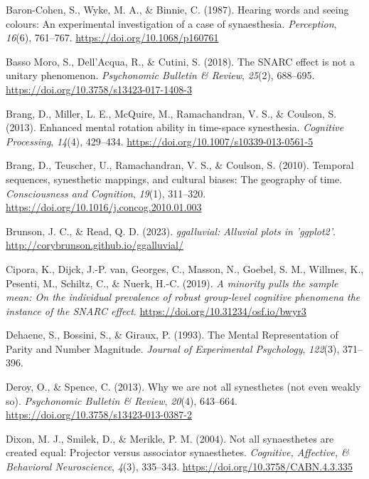 \documentclass[
  man,
  floatsintext,
  longtable,
  a4paper,
  nolmodern,
  notxfonts,
  notimes,
  colorlinks=true,linkcolor=blue,citecolor=blue,urlcolor=blue]{apa7}
\newlength{\cslhangindent}
\newenvironment{CSLReferences}[2] %
 {\begin{list}{}{%
  \setlength{\itemindent}{0pt}
  \setlength{\leftmargin}{0pt}
  \setlength{\parsep}{0pt}
  \ifodd #1
   \setlength{\leftmargin}{\cslhangindent}
   \setlength{\itemindent}{-1\cslhangindent}
  \fi
  \setlength{\itemsep}{#2\baselineskip}}}
 {\end{list}}
\begin{document}
\protect{}\label{refs}
\begin{CSLReferences}{1}{0}
Baron-Cohen, S., Wyke, M. A., \& Binnie, C. (1987). Hearing words and
seeing colours: An experimental investigation of a case of synaesthesia.
\emph{Perception}, \emph{16}(6), 761--767.
\url{https://doi.org/10.1068/p160761}

Basso Moro, S., Dell'Acqua, R., \& Cutini, S. (2018). The SNARC effect
is not a unitary phenomenon. \emph{Psychonomic Bulletin \& Review},
\emph{25}(2), 688--695. \url{https://doi.org/10.3758/s13423-017-1408-3}

Brang, D., Miller, L. E., McQuire, M., Ramachandran, V. S., \& Coulson,
S. (2013). Enhanced mental rotation ability in time-space synesthesia.
\emph{Cognitive Processing}, \emph{14}(4), 429--434.
\url{https://doi.org/10.1007/s10339-013-0561-5}

Brang, D., Teuscher, U., Ramachandran, V. S., \& Coulson, S. (2010).
Temporal sequences, synesthetic mappings, and cultural biases: The
geography of time. \emph{Consciousness and Cognition}, \emph{19}(1),
311--320. \url{https://doi.org/10.1016/j.concog.2010.01.003}

Brunson, J. C., \& Read, Q. D. (2023). \emph{{ggalluvial}: Alluvial
plots in 'ggplot2'}. \url{http://corybrunson.github.io/ggalluvial/}

Cipora, K., Dijck, J.-P. van, Georges, C., Masson, N., Goebel, S. M.,
Willmes, K., Pesenti, M., Schiltz, C., \& Nuerk, H.-C. (2019). \emph{A
minority pulls the sample mean: On the individual prevalence of robust
group-level cognitive phenomena {\textendash} the instance of the SNARC
effect}. \url{https://doi.org/10.31234/osf.io/bwyr3}

Dehaene, S., Bossini, S., \& Giraux, P. (1993). The Mental
Representation of Parity and Number Magnitude. \emph{Journal of
Experimental Psychology}, \emph{122}(3), 371--396.

Deroy, O., \& Spence, C. (2013). Why we are not all synesthetes (not
even weakly so). \emph{Psychonomic Bulletin \& Review}, \emph{20}(4),
643--664. \url{https://doi.org/10.3758/s13423-013-0387-2}

Dixon, M. J., Smilek, D., \& Merikle, P. M. (2004). Not all synaesthetes
are created equal: Projector versus associator synaesthetes.
\emph{Cognitive, Affective, \& Behavioral Neuroscience}, \emph{4}(3),
335--343. \url{https://doi.org/10.3758/CABN.4.3.335}


\end{CSLReferences}
\end{document}
